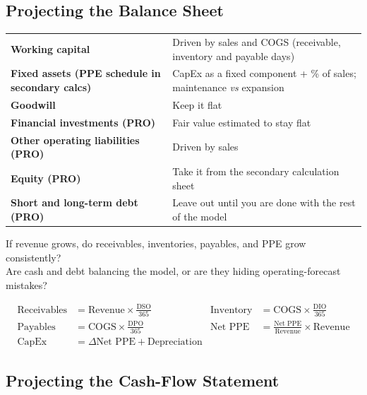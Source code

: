 \subsection[Projecting the Balance Sheet]{Projecting the Balance Sheet }

\begin{center}
\small
\begin{tabularx}{\textwidth}{@{}>{\bfseries}p{4.2cm}X@{}}
\toprule
Working capital & Driven by sales and COGS (receivable, inventory and payable days)\\
Fixed assets (PPE schedule in secondary calcs) & CapEx as a fixed component + \% of sales; maintenance \emph{vs} expansion\\
Goodwill & Keep it flat\\
Financial investments \textnormal{(PRO)} & Fair value estimated to stay flat\\
Other operating liabilities \textnormal{(PRO)} & Driven by sales\\
Equity \textnormal{(PRO)} & Take it from the secondary calculation sheet\\
Short and long-term debt \textnormal{(PRO)} & Leave out until you are done with the rest of the model\\
\bottomrule
\end{tabularx}
\end{center}
\begin{keybox}
If revenue grows, do receivables, inventories, payables, and PPE grow consistently?\\
Are cash and debt balancing the model, or are they hiding operating-forecast mistakes?
\end{keybox}
\begin{addbox}
\vspace{-6pt}
\begin{align*}
\text{Receivables} &= \text{Revenue}\times\frac{\text{DSO}}{365} & \text{Inventory} &= \text{COGS}\times\frac{\text{DIO}}{365}\\
\text{Payables} &= \text{COGS}\times\frac{\text{DPO}}{365} & \text{Net PPE} &= \frac{\text{Net PPE}}{\text{Revenue}}\times\text{Revenue}\\
\text{CapEx} &= \Delta\text{Net PPE}+\text{Depreciation}
\end{align*}
\end{addbox}

\subsection[Projecting the Cash-Flow Statement]{Projecting the Cash-Flow Statement }

